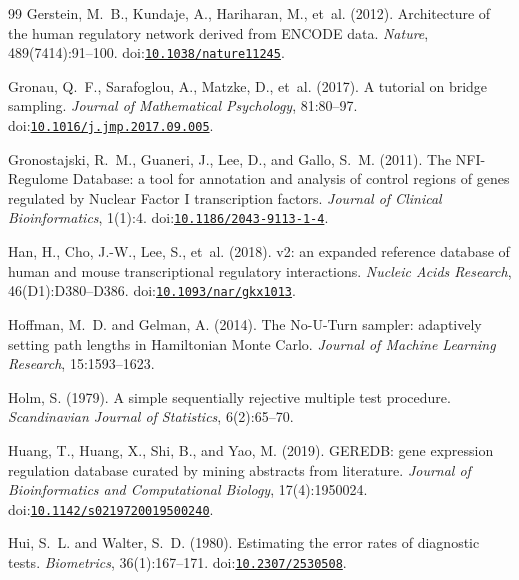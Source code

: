 \begin{thebibliography}{99}
Gerstein, M.~B., Kundaje, A., Hariharan, M., et~al. (2012).
\newblock Architecture of the human regulatory network derived from {ENCODE} data.
\newblock \emph{Nature}, 489(7414):91--100.
\newblock doi:\href{https://doi.org/10.1038/nature11245}{\nolinkurl{10.1038/nature11245}}.

Gronau, Q.~F., Sarafoglou, A., Matzke, D., et~al. (2017).
\newblock A tutorial on bridge sampling.
\newblock \emph{Journal of Mathematical Psychology}, 81:80--97.
\newblock doi:\href{https://doi.org/10.1016/j.jmp.2017.09.005}{\nolinkurl{10.1016/j.jmp.2017.09.005}}.

Gronostajski, R.~M., Guaneri, J., Lee, D., and Gallo, S.~M. (2011).
\newblock The NFI-Regulome Database: a tool for annotation and analysis of control regions of genes regulated by Nuclear Factor I transcription factors.
\newblock \emph{Journal of Clinical Bioinformatics}, 1(1):4.
\newblock doi:\href{https://doi.org/10.1186/2043-9113-1-4}{\nolinkurl{10.1186/2043-9113-1-4}}.

Han, H., Cho, J.-W., Lee, S., et~al. (2018).
 v2: an expanded reference database of human and mouse transcriptional regulatory interactions.
\newblock \emph{Nucleic Acids Research}, 46(D1):D380--D386.
\newblock doi:\href{https://doi.org/10.1093/nar/gkx1013}{\nolinkurl{10.1093/nar/gkx1013}}.

Hoffman, M.~D. and Gelman, A. (2014).
\newblock The No-U-Turn sampler: adaptively setting path lengths in {H}amiltonian {M}onte {C}arlo.
\newblock \emph{Journal of Machine Learning Research}, 15:1593--1623.

Holm, S. (1979).
\newblock A simple sequentially rejective multiple test procedure.
\newblock \emph{Scandinavian Journal of Statistics}, 6(2):65--70.

Huang, T., Huang, X., Shi, B., and Yao, M. (2019).
\newblock GEREDB: gene expression regulation database curated by mining abstracts from literature.
\newblock \emph{Journal of Bioinformatics and Computational Biology}, 17(4):1950024.
\newblock doi:\href{https://doi.org/10.1142/s0219720019500240}{\nolinkurl{10.1142/s0219720019500240}}.

Hui, S.~L. and Walter, S.~D. (1980).
\newblock Estimating the error rates of diagnostic tests.
\newblock \emph{Biometrics}, 36(1):167--171.
\newblock doi:\href{https://doi.org/10.2307/2530508}{\nolinkurl{10.2307/2530508}}.


\end{thebibliography}
